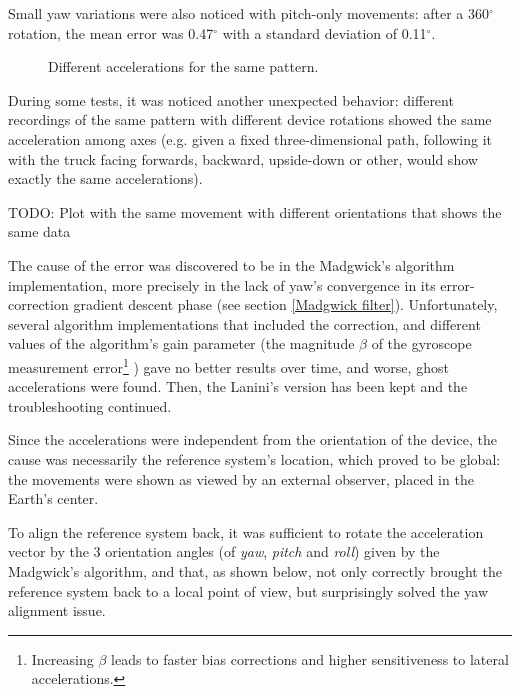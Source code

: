 Small yaw variations were also noticed with pitch-only movements: after a 360$^{\circ}$ rotation, the mean error was 0.47$^{\circ}$ with a standard deviation of 0.11$^{\circ}$.

\begin{center}
	\begin{figure}[ht]
		\caption{Different accelerations for the same pattern.}
	\end{figure}
\end{center}

During some tests, it was noticed another unexpected behavior: different recordings of the same pattern with different device rotations showed the same acceleration among axes (e.g. given a fixed three-dimensional path, following it with the truck facing forwards, backward, upside-down or other, would show exactly the same accelerations).
\bigbreak

TODO: Plot with the same movement with different orientations that shows the same data
\bigbreak

The cause of the error was discovered to be in the Madgwick's algorithm implementation, more precisely in the lack of yaw's convergence in its error-correction gradient descent phase (see section \ref{Madgwick filter}). Unfortunately, several algorithm implementations that included the correction, and different values of the algorithm's gain parameter (the magnitude $\beta$ of the gyroscope measurement error\footnote{Increasing $\beta$ leads to faster bias corrections and higher sensitiveness to lateral accelerations.} \cite[13]{Mad10}) gave no better results over time, and worse, ghost accelerations were found. Then, the Lanini's version has been kept and the troubleshooting continued.
\bigbreak

Since the accelerations were independent from the orientation of the device, the cause was necessarily the reference system's location, which proved to be global: the movements were shown as viewed by an external observer, placed in the Earth's center.

To align the reference system back, it was sufficient to rotate the acceleration vector by the 3 orientation angles (of \textit{yaw}, \textit{pitch} and \textit{roll}) given by the Madgwick's algorithm, and that, as shown below, not only correctly brought the reference system back to a local point of view, but surprisingly solved the yaw alignment issue.

